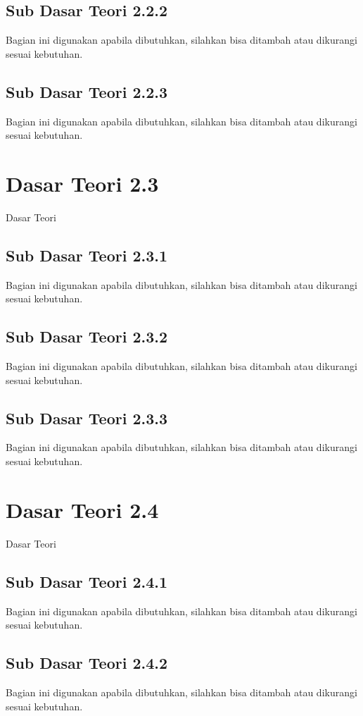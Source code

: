 \subsection{Sub Dasar Teori 2.2.2}
Bagian ini digunakan apabila dibutuhkan, silahkan bisa ditambah atau dikurangi sesuai kebutuhan.

\subsection{Sub Dasar Teori 2.2.3}
Bagian ini digunakan apabila dibutuhkan, silahkan bisa ditambah atau dikurangi sesuai kebutuhan.

\section{Dasar Teori 2.3}
Dasar Teori

\subsection{Sub Dasar Teori 2.3.1}
Bagian ini digunakan apabila dibutuhkan, silahkan bisa ditambah atau dikurangi sesuai kebutuhan.

\subsection{Sub Dasar Teori 2.3.2}
Bagian ini digunakan apabila dibutuhkan, silahkan bisa ditambah atau dikurangi sesuai kebutuhan.

\subsection{Sub Dasar Teori 2.3.3}
Bagian ini digunakan apabila dibutuhkan, silahkan bisa ditambah atau dikurangi sesuai kebutuhan.

\section{Dasar Teori 2.4}
Dasar Teori

\subsection{Sub Dasar Teori 2.4.1}
Bagian ini digunakan apabila dibutuhkan, silahkan bisa ditambah atau dikurangi sesuai kebutuhan.

\subsection{Sub Dasar Teori 2.4.2}
Bagian ini digunakan apabila dibutuhkan, silahkan bisa ditambah atau dikurangi sesuai kebutuhan.

